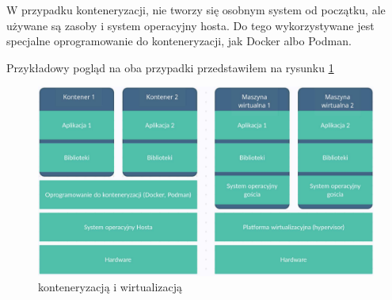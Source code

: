 \documentclass{iiuwb}
\begin{document}
W przypadku konteneryzacji, nie tworzy się osobnym system od początku, ale używane są zasoby i system operacyjny hosta. Do tego wykorzystywane jest specjalne oprogramowanie do konteneryzacji, jak Docker albo Podman.

Przykładowy pogląd na oba przypadki przedstawiłem na rysunku \ref{fig: Konteneryzacja i wirtualizacja}

\begin{figure}[!h]
\centering
\includegraphics[width=12cm]{kontenery_wirtualizacja.pdf}
\caption{konteneryzacją i wirtualizacją}
\label{fig: Konteneryzacja i wirtualizacja}
\end{figure}
\end{document}
